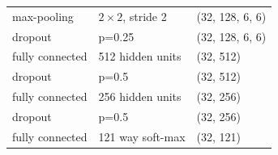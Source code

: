 \documentclass[11pt,oneside,a4paper]{article}
\numberwithin{equation}{section}
\begin{document}
\begin{table}[ht]
\begin{tabular}{lll}
max-pooling     & $2 \times 2$, stride 2    & (32, 128, 6, 6)    \\
dropout         & p=0.25           & (32, 128, 6, 6)    \\
fully connected & 512 hidden units & (32, 512)          \\
dropout         & p=0.5            & (32, 512)          \\
fully connected & 256 hidden units & (32, 256)          \\
dropout         & p=0.5            & (32, 256)          \\
fully connected & 121 way soft-max & (32, 121)          \\ \hline
\end{tabular}
\end{table}
\end{document}
